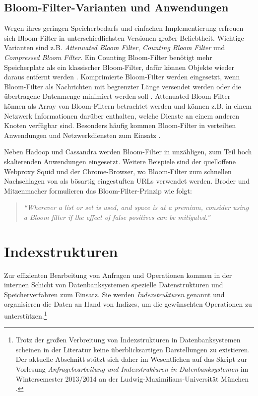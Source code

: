 \subsection{Bloom-Filter-Varianten und Anwendungen}\label{sec:bloom-anwendungen}
Wegen ihres geringen Speicherbedarfs und einfachen Implementierung erfreuen sich Bloom-Filter in unterschiedlichsten Versionen großer Beliebtheit. Wichtige Varianten sind z.B. \textit{Attenuated Bloom Filter}, \textit{Counting Bloom Filter} und \textit{Compressed Bloom Filter}. Ein Counting Bloom-Filter benötigt mehr Speicherplatz als ein klassischer Bloom-Filter, dafür können Objekte wieder daraus entfernt werden \cite{Fan2000}. Komprimierte Bloom-Filter werden eingesetzt, wenn Bloom-Filter als Nachrichten mit begrenzter Länge versendet werden oder die übertragene Datenmenge minimiert werden soll \cite{Mitzenmacher2002}. Attenuated Bloom-Filter \cite{Sakuma2011} können als Array von Bloom-Filtern betrachtet werden und können z.B. in einem Netzwerk Informationen darüber enthalten, welche Dienste an einem anderen Knoten verfügbar sind. Besonders häufig kommen Bloom-Filter in verteilten Anwendungen und Netzwerkdiensten zum Einsatz \cite{Broder2004}. 

Neben Hadoop und Cassandra werden Bloom-Filter in unzähligen, zum Teil hoch skalierenden Anwendungen eingesetzt. Weitere Beispiele sind der quelloffene Webproxy Squid und der Chrome-Browser, wo Bloom-Filter zum schnellen Nachschlagen von als bösartig eingestuften URLs verwendet werden. Broder und Mitzenmacher formulieren das Bloom-Filter-Prinzip wie folgt: 
\begin{quote}
\textit{"`Wherever a list or set is used, and space is at a premium, consider using a Bloom filter if the effect of false positives can be mitigated."'} \cite{Broder2004}
\end{quote}
\section{Indexstrukturen}\label{sec:indexstrukturen}
Zur effizienten Bearbeitung von Anfragen und Operationen kommen in der internen Schicht von Datenbanksystemen spezielle Datenstrukturen und Speicherverfahren zum Einsatz. Sie werden \textit{Indexstrukturen} genannt und organisieren die Daten an Hand von Indizes, um die gewünschten Operationen zu unterstützen.\footnote{Trotz der großen Verbreitung von Indexstrukturen in Datenbanksystemen scheinen in der Literatur keine überblicksartigen Darstellungen zu existieren. Der aktuelle Abschnitt stützt sich daher im Wesentlichen auf das Skript zur Vorlesung \textit{Anfragebearbeitung und Indexstrukturen in Datenbanksystemen} im Wintersemester 2013/2014 an der Ludwig-Maximilians-Universität München \cite{Kriegel1994--2013}.}

